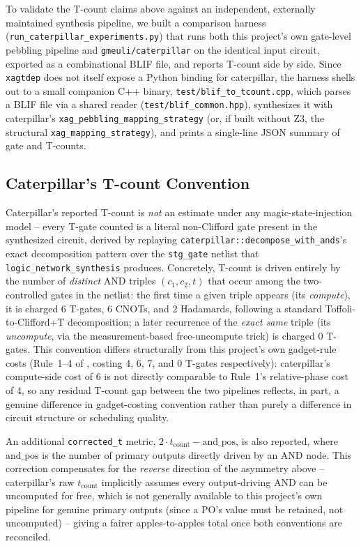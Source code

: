 To validate the T-count claims above against an independent,
externally maintained synthesis pipeline, we built a comparison
harness (\texttt{run\_caterpillar\_experiments.py}) that runs both
this project's own gate-level pebbling pipeline and
\texttt{gmeuli/caterpillar} on the identical input circuit, exported
as a combinational BLIF file, and reports T-count side by side. Since
\texttt{xagtdep} does not itself expose a Python binding for
caterpillar, the harness shells out to a small companion C++ binary,
\texttt{test/blif\_to\_tcount.cpp}, which parses a BLIF file via a
shared reader (\texttt{test/blif\_common.hpp}), synthesizes it with
caterpillar's \texttt{xag\_pebbling\_mapping\_strategy} (or, if built
without Z3, the structural \texttt{xag\_mapping\_strategy}), and
prints a single-line JSON summary of gate and T-counts.

\subsection{Caterpillar's T-count Convention}

Caterpillar's reported T-count is \emph{not} an estimate under any
magic-state-injection model -- every T-gate counted is a literal
non-Clifford gate present in the synthesized circuit, derived by
replaying \texttt{caterpillar::decompose\_with\_ands}'s exact
decomposition pattern over the \texttt{stg\_gate} netlist that
\texttt{logic\_network\_synthesis} produces. Concretely, T-count is
driven entirely by the number of \emph{distinct} AND triples
$(c_1, c_2, t)$ that occur among the two-controlled gates in the
netlist: the first time a given triple appears (its \emph{compute}),
it is charged $6$ T-gates, $6$ CNOTs, and $2$ Hadamards, following a
standard Toffoli-to-Clifford+T decomposition; a later recurrence of
the \emph{exact same} triple (its \emph{uncompute}, via the
measurement-based free-uncompute trick) is charged $0$ T-gates. This
convention differs structurally from this project's own gadget-rule
costs (Rule~1--4 of , costing $4$, $6$, $7$, and
$0$ T-gates respectively): caterpillar's compute-side cost of $6$ is
not directly comparable to Rule~1's relative-phase cost of $4$, so
any residual T-count gap between the two pipelines reflects, in part,
a genuine difference in gadget-costing convention rather than purely
a difference in circuit structure or scheduling quality.

An additional \texttt{corrected\_t} metric,
$2 \cdot t_{\mathrm{count}} - \mathrm{and\_pos}$, is also reported,
where $\mathrm{and\_pos}$ is the number of primary outputs directly
driven by an AND node. This correction compensates for the
\emph{reverse} direction of the asymmetry above -- caterpillar's raw
$t_{\mathrm{count}}$ implicitly assumes every output-driving AND can
be uncomputed for free, which is not generally available to this
project's own pipeline for genuine primary outputs (since a PO's
value must be retained, not uncomputed) -- giving a fairer
apples-to-apples total once both conventions are reconciled.

